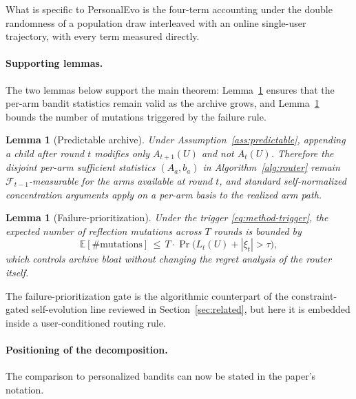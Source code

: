 \documentclass{article} %
\newtheorem{lemma}[theorem]{Lemma}
\providecommand{\E}{\mathbb{E}}
\begin{document}
What is specific to PersonalEvo is the four-term accounting under the double randomness of a population draw interleaved with an online single-user trajectory, with every term measured directly.

\paragraph{Supporting lemmas.}

\label{sec:method-supporting}

The two lemmas below support the main theorem: Lemma~\ref{lem:predictable} ensures that the per-arm bandit statistics remain valid as the archive grows, and Lemma~\ref{lem:failure} bounds the number of mutations triggered by the failure rule.

\begin{lemma}[Predictable archive]
\label{lem:predictable}
Under Assumption~\ref{ass:predictable}, appending a child after round $t$ modifies only $A_{t+1}(U)$ and not $A_t(U)$. Therefore the disjoint per-arm sufficient statistics $(A_a, b_a)$ in Algorithm~\ref{alg:router} remain $\mathcal{F}_{t-1}$-measurable for the arms available at round $t$, and standard self-normalized concentration arguments apply on a per-arm basis to the realized arm path.
\end{lemma}

\begin{lemma}[Failure-prioritization]
\label{lem:failure}
Under the trigger \eqref{eq:method-trigger}, the expected number of reflection mutations across $T$ rounds is bounded by
\begin{equation}
\label{eq:lem-failure}
\E[\#\mathrm{mutations}] \,\le\, T \cdot \Pr\bigl(L_t(U) + |\xi_t| > \tau\bigr),
\end{equation}
which controls archive bloat without changing the regret analysis of the router itself.
\end{lemma}

The failure-prioritization gate is the algorithmic counterpart of the constraint-gated self-evolution line reviewed in Section~\ref{sec:related}, but here it is embedded inside a user-conditioned routing rule.

\paragraph{Positioning of the decomposition.}
The comparison to personalized bandits can now be stated in the paper's notation.
\end{document}
